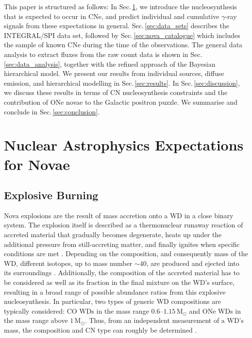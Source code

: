 \documentclass{aa}
\newcommand{\mrm}[1]{\mathrm{#1}}
\begin{document}
This paper is structured as follows:
%
In Sec.\,\ref{sec:nova_theory}, we introduce the nucleosynthesis that is expected to occur in CNe, and predict individual and cumulative $\gamma$-ray signals from these expectations in general.
%
Sec.\,\ref{sec:data_sets} describes the INTEGRAL/SPI data set, followed by Sec.\,\ref{sec:nova_catalogue} which includes the sample of known CNe during the time of the observations.
%
The general data analysis to extract fluxes from the raw count data is shown in Sec.\,\ref{sec:data_analysis}, together with the refined approach of the Bayesian hierarchical model.
%
We present our results from individual sources, diffuse emission, and hierarchical modelling in Sec.\,\ref{sec:results}.
%
In Sec.\,\ref{sec:discussion}, we discuss these results in terms of CN nucleosynthesis constraints and the contribution of ONe novae to the Galactic positron puzzle.
%
We summarise and conclude in Sec.\,\ref{sec:conclusion}.



\section{Nuclear Astrophysics Expectations for Novae}\label{sec:nova_theory}

\subsection{Explosive Burning}\label{sec:nova_review}
%
Nova explosions are the result of mass accretion onto a WD in a close binary system.
%
The explosion itself is described as a thermonuclear runaway reaction of accreted material that gradually becomes degenerate, heats up under the additional pressure from still-accreting matter, and finally ignites when specific conditions are met \citep[e.g.,][]{Jose1998_novae}.
%
Depending on the composition, and consequently mass of the WD, different isotopes, up to mass number $\sim 40$, are produced and ejected into its surroundings \citep[e.g.,][]{Jose1998_novae,Jose2001_novae_intermediate,abcdefgh,Starrfield2020_COnovae}.
%
Additionally, the composition of the accreted material has to be considered as well as its fraction in the final mixture on the WD's surface, resulting in a broad range of possible abundance ratios from this explosive nucleosynthesis.
%
In particular, two types of generic WD compositions are typically considered: CO WDs in the mass range $0.6$--$1.15\,\mrm{M_{\odot}}$ and ONe WDs in the mass range above $1\,\mrm{M_{\odot}}$.
%
Thus, from an independent measurement of a WD's mass, the composition and CN type can roughly be determined \citep[e.g.,][]{Gil-Pons2003_novae}.
\end{document}
